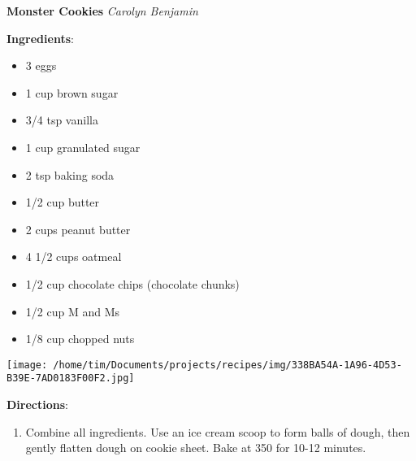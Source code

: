 \documentclass[11pt, twoside, openany]{book}
\begin{document}
\noindent\begin{minipage}[t]{\linewidth}%
{\Large\textbf{Monster Cookies}} \label{monster-cookies}\hfill\textit{Carolyn Benjamin}\\
\noindent\begin{minipage}[t]{0.78\linewidth}%
\textbf{Ingredients}:\vspace{-3mm}
\begin{multicols}{2}
\begin{itemize}\setlength\itemsep{-1mm}
\item 3 eggs
\item 1 cup brown sugar
\item 3/4 tsp vanilla
\item 1 cup granulated sugar
\item 2 tsp baking soda
\item 1/2 cup butter
\item 2 cups peanut butter
\item 4 1/2 cups oatmeal
\item 1/2 cup chocolate chips (chocolate chunks)
\item 1/2 cup M and Ms
\item 1/8 cup chopped nuts
\end{itemize}
\end{multicols}
\end{minipage}
\noindent\begin{minipage}[t]{0.18\linewidth}
\centering \strut\vspace*{-\baselineskip}\newline
\texttt{[image: /home/tim/Documents/projects/recipes/img/338BA54A-1A96-4D53-B39E-7AD0183F00F2.jpg]}\\
\end{minipage}\vspace{3mm}
\textbf{Directions}:
\vspace{-3mm}\begin{enumerate}\setlength\itemsep{-1mm}
\item Combine all ingredients. Use an ice cream scoop to form balls of dough, then gently flatten dough on cookie sheet. Bake at 350 for 10-12 minutes.
\end{enumerate}
\end{minipage}\vspace{8mm}
\end{document}
